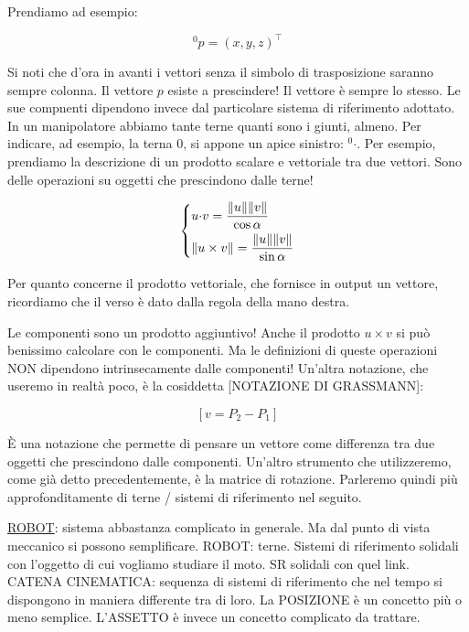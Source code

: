 Prendiamo ad esempio:

\[
	^0p = (x,y,z)^\top
\]

Si noti che d'ora in avanti i vettori senza il simbolo di trasposizione saranno sempre colonna. Il vettore $p$ esiste a prescindere! Il vettore è sempre lo stesso. Le sue compnenti dipendono invece dal particolare sistema di riferimento adottato. In un manipolatore abbiamo tante terne quanti sono i giunti, almeno. Per indicare, ad esempio, la terna 0, si appone un apice sinistro: $^0\mathord{\cdot}$. Per esempio, prendiamo la descrizione di un prodotto scalare e vettoriale tra due vettori. Sono delle operazioni su oggetti che prescindono dalle terne!

\[
	\left\{
	\begin{aligned}
	& u \mathord{\cdot} v = \frac{\lVert u\rVert\lVert v\rVert}{\cos{\alpha}}\\
	& \lVert u \times v\rVert = \frac{\lVert u\rVert\lVert v\rVert}{\sin{\alpha}}
	\end{aligned}
	\right.
\]

Per quanto concerne il prodotto vettoriale, che fornisce in output un vettore, ricordiamo che il verso è dato dalla regola della mano destra.

Le componenti sono un prodotto aggiuntivo! Anche il prodotto $u\times v$ si può benissimo calcolare con le componenti. Ma le definizioni di queste operazioni NON dipendono intrinsecamente dalle componenti! Un'altra notazione, che useremo in realtà poco, è la cosiddetta [NOTAZIONE DI GRASSMANN]:

\[
	[v = P_2 - P_1]
\]

\`E una notazione che permette di pensare un vettore come differenza tra due oggetti che prescindono dalle componenti. Un'altro strumento che utilizzeremo, come già detto precedentemente, è la matrice di rotazione. Parleremo quindi più approfonditamente di terne / sistemi di riferimento nel seguito.

\underline{ROBOT}: sistema abbastanza complicato in generale. Ma dal punto di vista meccanico si possono semplificare. ROBOT: terne. Sistemi di riferimento solidali con l'oggetto di cui vogliamo studiare il moto. SR solidali con quel link. CATENA CINEMATICA: sequenza di sistemi di riferimento che nel tempo si dispongono in maniera differente tra di loro. La POSIZIONE è un concetto più o meno semplice. L'ASSETTO è invece un concetto complicato da trattare.